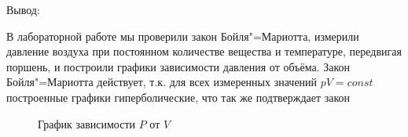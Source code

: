 Вывод:

В лабораторной работе мы проверили закон Бойля"=Мариотта, измерили давление воздуха при постоянном количестве вещества и температуре, передвигая поршень, и построили графики зависимости давления от объёма. Закон Бойля"=Мариотта действует, т.к. для всех измеренных значений \texttt{$p V = const$} построенные графики гиперболические, что так же подтверждает закон

\begin{figure}[!h]
\begin{center}
  \end{center}
\caption{График зависимости \texttt{$P$} от \texttt{$V$}}
\label{graph:main_graph}
\end{figure}

